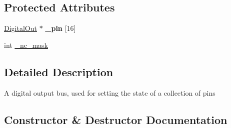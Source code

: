 \subsection*{Protected Attributes}
\begin{DoxyCompactItemize}
\item 
\hyperlink{classmbed_1_1DigitalOut}{Digital\+Out} $\ast$ {\bfseries \+\_\+pin} \mbox{[}16\mbox{]}\hypertarget{classmbed_1_1BusOut_aebb26dee44094ccbea4a66351bad1a9d}{}\label{classmbed_1_1BusOut_aebb26dee44094ccbea4a66351bad1a9d}

\item 
int \hyperlink{classmbed_1_1BusOut_ad044deaa2ea58e94340ee7d2c5b5779a}{\+\_\+nc\+\_\+mask}
\end{DoxyCompactItemize}


\subsection{Detailed Description}
A digital output bus, used for setting the state of a collection of pins 

\subsection{Constructor \& Destructor Documentation}
